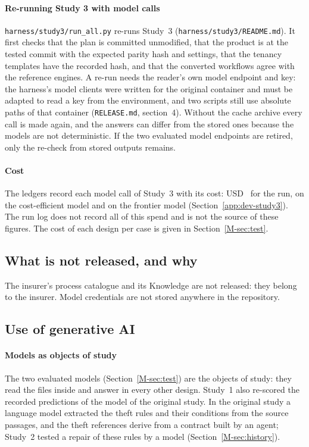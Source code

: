\paragraph{Re-running Study 3 with model calls}
\texttt{harness/\allowbreak{}study3/\allowbreak{}run\_all.py} re-runs Study~3 (\texttt{harness/\allowbreak{}study3/\allowbreak{}README.md}). It first checks that the plan is committed unmodified, that the product is at the tested commit with the expected parity hash and settings, that the tenancy templates have the recorded hash, and that the converted workflows agree with the reference engines. A re-run needs the reader's own model endpoint and key: the harness's model clients were written for the original container and must be adapted to read a key from the environment, and two scripts still use absolute paths of that container (\texttt{RELEASE.md}, section~4). Without the cache archive every call is made again, and the answers can differ from the stored ones because the models are not deterministic. If the two evaluated model endpoints are retired, only the re-check from stored outputs remains.

\paragraph{Cost}
The ledgers record each model call of Study~3 with its cost: USD~\sthreeSpendTotal{} for the run, \sthreeSpendLuna{} on the cost-efficient model and \sthreeSpendTerra{} on the frontier model (Section~\ref{app:dev-study3}). The run log does not record all of this spend and is not the source of these figures. The cost of each design per case is given in Section~\ref{M-sec:test}.

\subsection{What is not released, and why}
\label{app:release-not}

The insurer's process catalogue and its Knowledge are not released: they belong to the insurer. Model credentials are not stored anywhere in the repository.

\subsection{Use of generative AI}
\label{app:genai}

\paragraph{Models as objects of study}
The two evaluated models (Section~\ref{M-sec:test}) are the objects of study: they read the files inside \casepath and answer in every other design. Study~1 also re-scored the recorded predictions of the model of the original study. In the original study a language model extracted the theft rules and their conditions from the source passages, and the theft references derive from a contract built by an agent; Study~2 tested a repair of these rules by a model (Section~\ref{M-sec:history}).

